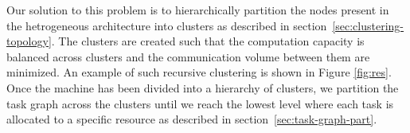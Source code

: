 Our solution to this problem is to hierarchically partition the nodes
present in the hetrogeneous architecture into clusters as described in
section~\ref{sec:clustering-topology}. The clusters are created such that
the computation capacity is balanced across clusters and the
communication volume between them are minimized. An example of such
recursive clustering is shown in Figure \ref{fig:res}. Once the machine
has been divided into a hierarchy of clusters, we partition the task
graph across the clusters until we reach the lowest level where each
task is allocated to a specific resource as described in
section~\ref{sec:task-graph-part}.




